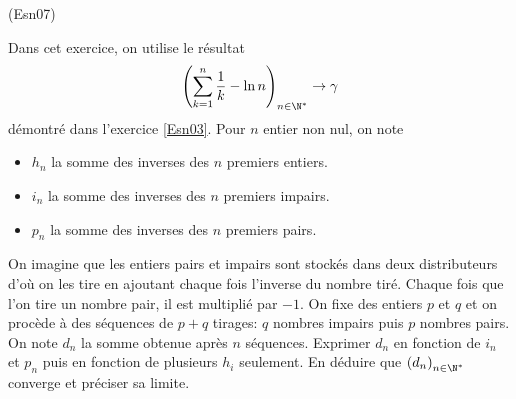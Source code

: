 \begin{tiny}(Esn07)\end{tiny} Dans cet exercice, on utilise le résultat
\begin{displaymath}
  \left( \sum_{k=1}^n \frac{1}{k} -\ln n\right)_{n\in \N^*} \rightarrow \gamma 
\end{displaymath}
démontré dans l'exercice \ref{Esn03}. Pour $n$ entier  non nul, on note
\begin{itemize}
  \item $h_n$ la somme des inverses des $n$ premiers entiers.
  \item $i_n$ la somme des inverses des $n$ premiers impairs.
  \item $p_n$ la somme des inverses des $n$ premiers pairs.
\end{itemize}
On imagine que les entiers pairs et impairs sont stockés dans deux distributeurs d'où on les tire en ajoutant chaque fois l'inverse du nombre tiré. Chaque fois que l'on tire un nombre pair, il est multiplié par $-1$.\newline
On fixe des entiers $p$ et $q$ et on procède à des séquences de $p+q$ tirages: $q$ nombres impairs puis $p$ nombres pairs. On note $d_n$ la somme obtenue après $n$ séquences. Exprimer $d_n$ en fonction de $i_n$ et $p_n$ puis en fonction de plusieurs $h_i$ seulement. En déduire que $\left( d_n\right)_{n\in \N^*}$ converge et préciser sa limite.